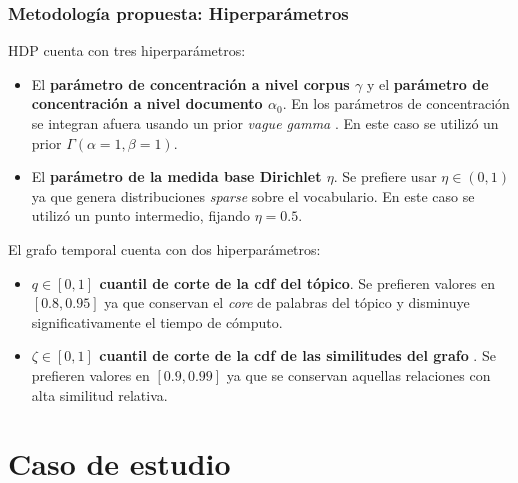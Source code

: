 \documentclass[
	spanish, %
	aspectratio=43, %
	hyperref={pdfencoding=auto,psdextra},
	xcolor={dvipsnames,table,usenames},
]{beamer}
\begin{document}
\begin{frame}[t]
\frametitle{Metodología propuesta: Hiperparámetros}

HDP cuenta con tres hiperparámetros:
\begin{itemize} 
  \item El \textbf{parámetro de concentración a nivel corpus $\gamma$} y el \textbf{parámetro de concentración a nivel documento $\alpha_{0}$}. En \cite{teh2005sharing} los parámetros de concentración se integran afuera usando un prior \textit{vague gamma} \cite{escobar1995bayesian}. En este caso se utilizó un prior $\Gamma(\alpha=1, \beta=1)$.
  \item El \textbf{parámetro de la medida base Dirichlet $\eta$}. Se prefiere usar $\eta\in (0,1)$ ya que genera distribuciones \textit{sparse} sobre el vocabulario. En este caso se utilizó un punto intermedio, fijando $\eta=0.5$.
\end{itemize}

El grafo temporal cuenta con dos hiperparámetros:
\begin{itemize}
  \item \textbf{$q \in [0,1]$ cuantil de corte de la cdf del tópico}. Se prefieren valores en $[0.8, 0.95]$ ya que conservan el \textit{core} de palabras del tópico y disminuye significativamente el tiempo de cómputo.
  \item \textbf{$\zeta\in[0,1]$ cuantil de corte de la cdf de las similitudes del grafo }. Se prefieren valores en $[0.9, 0.99]$ ya que se conservan aquellas relaciones con alta similitud relativa.
\end{itemize}

\end{frame}


\section{Caso de estudio}
\end{document}
